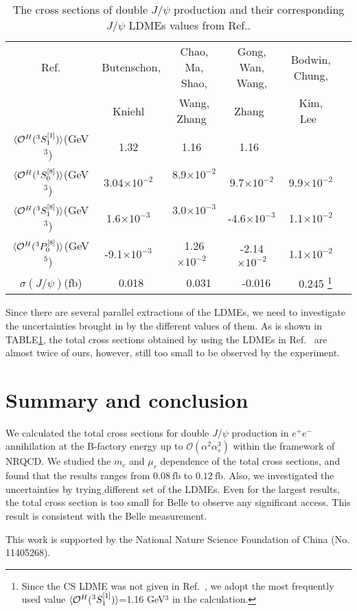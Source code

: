 \documentclass[preprint,showpacs,preprintnumbers,amssymb,aps]{revtex4}
\def\fb{\mathrm{~fb}}
\begin{document}
\begin{table}[htbp]
\begin{center}
\caption{
\label{tab:ldme}
The cross sections of double $J/\psi$ production and their corresponding $J/\psi$ LDMEs values from Ref.\cite{Butenschoen:2011yh,Chao:2012iv,Gong:2012ug,Bodwin:2014gia}.
}
\begin{tabular}{cccccc}
\hline
\hline
Ref.&Butenschon,&Chao, Ma, Shao,&Gong, Wan, Wang,&Bodwin, Chung, \\
&Kniehl~\cite{Butenschoen:2011yh}&Wang, Zhang~\cite{Chao:2012iv}&Zhang~\cite{Gong:2012ug}&Kim, Lee~\cite{Bodwin:2014gia} \\
\hline
$\langle{\cal O}^{H}(^{3}S^{[1]}_{1})\rangle$(GeV$^3$)~&1.32~&1.16~&1.16~&   \\
$\langle{\cal O}^{H}(^{1}S^{[8]}_{0})\rangle$(GeV$^3$)~&3.04$\times10^{-2}$~& 8.9$\times10^{-2}$~&9.7$\times10^{-2}$&9.9$\times10^{-2}$  \\
$\langle{\cal O}^{H}(^{3}S^{[8]}_{1})\rangle$(GeV$^3$)~&1.6$\times10^{-3}$~& 3.0$\times10^{-3}$~&-4.6$\times10^{-3}$&1.1$\times10^{-2}$ &   \\
$\langle{\cal O}^{H}(^{3}P^{[8]}_{0})\rangle$(GeV$^5$)~&-9.1$\times10^{-3}$~& 1.26$\times10^{-2}$~&-2.14$\times10^{-2}$& 1.1$\times10^{-2}$ \\
\hline
$\sigma(J/\psi)$(fb)& 0.018&~ 0.031&~ -0.016 &~ 0.245
\footnote[1]{Since the CS LDME was not given in Ref.~\cite{Bodwin:2014gia}, we adopt the most frequently used value $\langle{\cal O}^{H}(^{3}S^{[1]}_{1})\rangle$=1.16 GeV$^3$ in the calculation.}  \\
\hline
\hline
\end{tabular}
\end{center}
\end{table}

Since there are several parallel extractions of the LDMEs, we need to investigate the uncertainties brought in by the different values of them.
As is shown in TABLE\ref{tab:ldme}, the total cross sections obtained by using the LDMEs in Ref.~\cite{Bodwin:2014gia} are almost twice of ours,
however, still too small to be observed by the experiment.

\section{Summary and conclusion}\label{cha:4}


We calculated the total cross sections for double $J/\psi$ production in $e^+e^-$ annihilation at the B-factory energy up to $\mathcal{O}(\alpha^2\alpha_s^3)$ within the framework of NRQCD.
We studied the $m_c$ and $\mu_r$ dependence of the total cross sections,
and found that the results ranges from $0.08\fb$ to $0.12\fb$.
Also, we investigated the uncertainties by trying different set of the LDMEs.
Even for the largest results, the total cross section is too small for Belle to observe any significant access.
This result is consistent with the Belle measurement.

\acknowledgments
{This work is supported by the National Nature Science Foundation of China (No. 11405268).}

\end{document}
